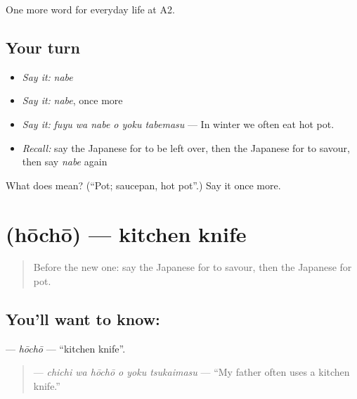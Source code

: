\begin{grammarlens}[title={What you've built}]
One more word for everyday life at A2.
\end{grammarlens}

\subsection*{Your turn}
\begin{itemize}
\raggedright
  \item \emph{Say it:} \emph{nabe}
  \item \emph{Say it:} \emph{nabe}, once more
  \item \emph{Say it:} \emph{fuyu wa nabe o yoku tabemasu} — In winter we often eat hot pot.
  \item \emph{Recall:} say the Japanese for to be left over, then the Japanese for to savour, then say \emph{nabe} again
\end{itemize}

\begin{tcolorbox}[breakable,colback=teal!4,colframe=teal!35!black,title={Before you move on}]
What does  mean? (\textquotedblleft{}Pot; saucepan, hot pot\textquotedblright{}.) Say it once more.
\end{tcolorbox}
\section[\texorpdfstring{\ja{ほうちょう} (hōchō)}{ほうちょう (hōchō)}]{ (hōchō) — kitchen knife}

\label{lesson:JA-C174-houchou}



\begin{quote}
Before the new one: say the Japanese for to savour, then the Japanese for pot.
\end{quote}

\subsection*{You'll want to know: }
\textbf{} — \emph{hōchō} — \textquotedblleft{}kitchen knife\textquotedblright{}.

\begin{quote}
\textbf{   } — \emph{chichi wa hōchō o yoku tsukaimasu} — \textquotedblleft{}My father often uses a kitchen knife.\textquotedblright{}
\end{quote}


